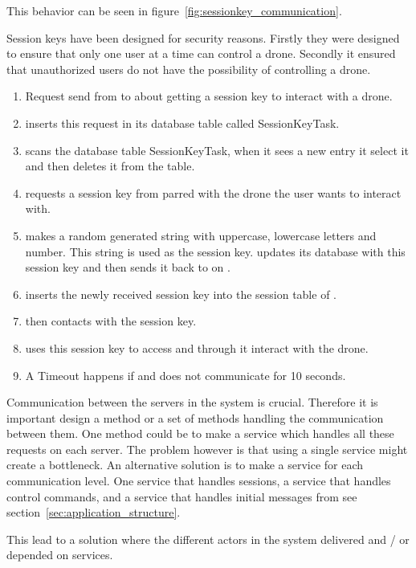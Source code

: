This behavior can be seen in figure~\ref{fig:sessionkey_communication}. 

Session keys have been designed for security reasons.
Firstly they were designed to ensure that only one user at a time can control a drone.
Secondly it ensured that unauthorized users do not have the possibility of controlling a drone.

\begin{enumerate}
	\item Request send from  to  about getting a session key to interact with a drone.
	\item {} inserts this request in its database table called SessionKeyTask.
	\item {} scans the database table SessionKeyTask, when it sees a new entry it select it and then deletes it from the table.
	\item {} requests a session key from  parred with the drone the user wants to interact with.
	\item {} makes a random generated string with uppercase, lowercase letters and number. This string is used as the session key.  updates its database with this session key and then sends it back to  on .
	\item {} inserts the newly received session key into the session table of .
	\item {} then contacts  with the session key.
	\item {} uses this session key to access  and through it interact with the drone.
	\item A Timeout happens if  and  does not communicate for 10 seconds.
\end{enumerate}

Communication between the servers in the system is crucial. 
Therefore it is important design a method or a set of methods handling the communication between them. 
One method could be to make a service which handles all these requests on each server.
The problem however is that using a single service might create a bottleneck.
An alternative solution is to make a service for each communication level.
One service that handles sessions, a service that handles control commands, and a service that handles initial messages from  see section~\ref{sec:application_structure}.

This lead to a solution where the different actors in the system delivered and / or depended on services.

